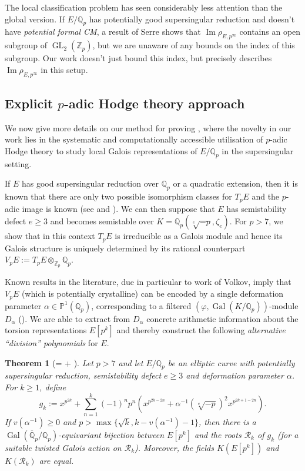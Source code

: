 \documentclass{amsart}
\newcommand{\op}[1]{\operatorname{#1}}
\newcommand{\Qp}{\mathbb{Q}_p}
\newtheorem{theorem}{Theorem}
\theoremstyle{definition}
\newcommand{\Z}{\mathbb{Z}}
\newcommand{\Q}{\mathbb{Q}}
\newcommand{\Gal}{\operatorname{Gal}}
\newcommand{\GL}{\operatorname{GL}}
\numberwithin{theorem}{section}
\numberwithin{equation}{section}
\begin{document}
The local classification problem has seen considerably less attention than the global version. If $E/\Qp$ has potentially good supersingular reduction and doesn't have \textit{potential formal CM}, a result of Serre \cite[Théorème 5]{MR242839} shows that $\op{Im} \rho_{E,p^{\infty}}$ contains an open subgroup of $\GL_2(\Z_p)$, but we are unaware of any bounds on the index of this subgroup. Our work doesn't just bound this index, but precisely describes $\op{Im} \rho_{E,p^{\infty}}$ in this setup.



\subsection{Explicit $p$-adic Hodge theory approach}
We now give more details on our method for proving , where the novelty in our work lies in the systematic and computationally accessible utilisation of $p$-adic Hodge theory to study local Galois representations of $E/\Qp$ in the supersingular setting.

If $E$ has good supersingular reduction over $\Qp$ or a quadratic extension, then it is known that there are only two possible isomorphism classes for $T_pE$ and the $p$-adic image is known (see \cite[top of p.~34]{Volkov} and ). We can then suppose that $E$ has semistability defect $e \geq 3$ and becomes semistable over $K=\Qp(\sqrt[e]{-p},\zeta_e)$. For $p>7$, we show that in this context $T_pE$ is irreducible as a Galois module and hence its Galois structure is uniquely determined by its rational counterpart $V_pE:=T_pE \otimes_{\Z_p} \Q_p$.

Known results in the literature, due in particular to work of Volkov, imply that $V_pE$ (which is potentially crystalline) can be encoded by a single deformation parameter $\alpha \in \mathbb{P}^1(\Qp)$, corresponding to a filtered $(\varphi,\Gal(K/\Qp))$-module $D_{\alpha}$ (). We are able to extract from $D_\alpha$ concrete arithmetic information about the torsion representations $E[p^k]$ and thereby construct the following \textit{alternative ``division'' polynomials} for $E$.


\begin{theorem}[= + ]\label{introthm: alternative division polynomials}
    Let $p>7$ and let $E/\Qp$ be an elliptic curve with potentially supersingular reduction, semistability defect $e\geq 3$ and deformation parameter $\alpha$. For $k \geq 1$, define 
    \[
    g_k:=x^{p^{2k}} + \sum_{n=1}^k (-1)^np^n(x^{p^{2k-2n}} + \alpha^{-1}(\sqrt[e]{-p})^2x^{p^{2k+1-2n}}).
    \]
    If $v(\alpha^{-1}) \geq 0$ and $p> \max\{\sqrt{k}, k-v(\alpha^{-1})-1\}$, then there is a $\op{Gal}(\overline{\Q}_p/\Qp)$-equivariant bijection between $E[p^k]$ and the roots $\mathcal{R}_k$ of $g_k$ (for a suitable twisted Galois action on $\mathcal{R}_k$). Moreover, the fields $K(E[p^k])$ and $K(\mathcal{R}_k)$ are equal.
\end{theorem}
\end{document}
